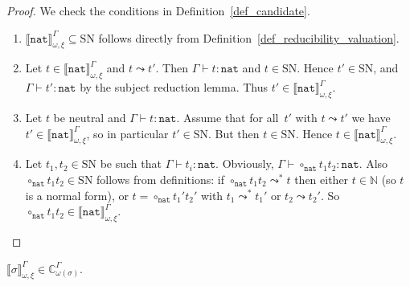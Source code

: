 \documentclass[runningheads,a4paper]{llncs}
\newcommand{\arrnormalise}{\leadsto}
\newcommand{\nat}{\mathtt{nat}}
\newcommand{\SN}{\mathrm{SN}}
\newcommand{\Cb}{\mathbb{C}}
\newcommand{\Nbb}{\mathbb{N}}
\newcommand{\val}[3]{\ensuremath{\llbracket#1\rrbracket_{#2}^{#3}}}
\newcommand{\proves}{\vdash}
\begin{document}
\begin{proof}
  We check the conditions in Definition~\ref{def_candidate}.
  \begin{enumerate}
  \item $\val{\nat}{\omega,\xi}{\Gamma} \subseteq \SN$ follows
    directly from Definition~\ref{def_reducibility_valuation}.
  \item Let $t \in \val{\nat}{\omega,\xi}{\Gamma}$ and
    $t \leadsto t'$. Then $\Gamma \proves t : \nat$ and $t \in
    \SN$. Hence $t' \in \SN$, and $\Gamma \proves t' : \nat$ by the
    subject reduction lemma. Thus
    $t' \in \val{\nat}{\omega,\xi}{\Gamma}$.
  \item Let $t$ be neutral and $\Gamma \proves t : \nat$. Assume that
    for all~$t'$ with $t \leadsto t'$ we have
    $t' \in \val{\nat}{\omega,\xi}{\Gamma}$, so in particular
    $t' \in \SN$. But then $t \in \SN$. Hence
    $t \in \val{\nat}{\omega,\xi}{\Gamma}$.
  \item Let $t_1,t_2 \in \SN$ be such that
    $\Gamma \proves t_i : \nat$. Obviously,
    $\Gamma \proves \circ_\nat t_1 t_2 : \nat$. Also
    $\circ_\nat t_1 t_2 \in \SN$ follows from definitions:
    if $\circ_\nat t_1 t_2 \arrnormalise^* t$ then either $t \in \Nbb$
    (so $t$ is a normal form), or $t = \circ_\nat t_1' t_2'$ with
    $t_1 \arrnormalise^* t_1'$ or $t_2 \arrnormalise t_2'$. So
    $\circ_\nat t_1 t_2 \in \val{\nat}{\omega,\xi}{\Gamma}$.
  \end{enumerate}
\end{proof}


\begin{lemma}\label{lem_val_computable}
  $\val{\sigma}{\omega,\xi}{\Gamma} \in \Cb_{\omega(\sigma)}^\Gamma$.
\end{lemma}
\end{document}
